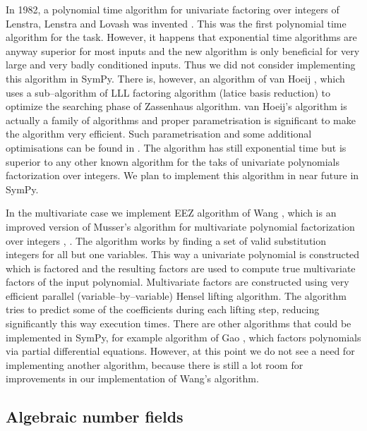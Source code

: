 In 1982, a polynomial time algorithm for univariate factoring over integers of Lenstra, Lenstra and
Lovash was invented \cite{Lenstra1982factor}. This was the first polynomial time algorithm for the task.
However, it happens that exponential time algorithms are anyway superior for most inputs and the new
algorithm is only beneficial for very large and very badly conditioned inputs. Thus we did not consider
implementing this algorithm in SymPy. There is, however, an algorithm of van Hoeij \cite{vanHoeij2002knapsack},
which uses a sub--algorithm of LLL factoring algorithm (latice basis reduction) to optimize the searching
phase of Zassenhaus algorithm. van Hoeij's algorithm is actually a family of algorithms and proper
parametrisation is significant to make the algorithm very efficient. Such parametrisation and some
additional optimisations can be found in \cite{Belabas2004relative}. The algorithm has still exponential
time but is superior to any other known algorithm for the taks of univariate polynomials factorization
over integers. We plan to implement this algorithm in near future in SymPy.

In the multivariate case we implement EEZ algorithm of Wang \cite{Wang1978improved}, which is an improved
version of Musser's algorithm for multivariate polynomial factorization over integers \cite{Musser1975factor},
\cite{Wang1975integers}. The algorithm works by finding a set of valid substitution integers for all but
one variables. This way a univariate polynomial is constructed which is factored and the resulting
factors are used to compute true multivariate factors of the input polynomial. Multivariate factors
are constructed using very efficient parallel (variable--by--variable) Hensel lifting algorithm. The
algorithm tries to predict some of the coefficients during each lifting step, reducing significantly
this way execution times. There are other algorithms that could be implemented in SymPy, for example
algorithm of Gao \cite{Gao2003partial}, which factors polynomials via partial differential equations.
However, at this point we do not see a need for implementing another algorithm, because there is
still a lot room for improvements in our implementation of Wang's algorithm.


\subsection{Algebraic number fields}

